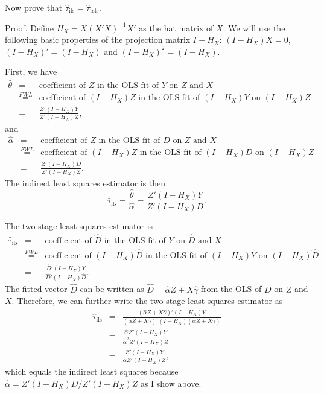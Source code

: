 \documentclass[11pt]{article}
\theoremstyle{definition}
\begin{document}
Now prove that $ \hat{\tau}_{\text{ils}}  = \hat{\tau}_{\text{tsls}}$. 



Proof. Define $H_X = X(X'X)^{-1}X'$ as the hat matrix of $X$. We will use the following basic properties of the projection matrix $I-H_X$: $(I-H_X)X=0$, $(I-H_X)' = (I-H_X)$ and $(I-H_X)^2= (I-H_X)$.

First, we have
\begin{eqnarray*}
\hat{\theta} &=&  \text{coefficient of } Z \text{ in the OLS fit of } Y \text{ on } Z \text{ and } X \\
&\stackrel{FWL}{=} & \text{coefficient of } (I-H_X)Z \text{ in the OLS fit of } (I-H_X)Y \text{ on } (I-H_X)Z \\
&=& \frac{  Z' (I-H_X) Y }{  Z' (I-H_X) Z },
\end{eqnarray*}
and
\begin{eqnarray*}
\hat{\alpha} &=&  \text{coefficient of } Z \text{ in the OLS fit of } D \text{ on } Z \text{ and } X \\
&\stackrel{FWL}{=} & \text{coefficient of } (I-H_X)Z \text{ in the OLS fit of } (I-H_X)D \text{ on } (I-H_X)Z \\
&=& \frac{  Z' (I-H_X) D }{  Z' (I-H_X) Z }.
\end{eqnarray*}
The indirect least squares estimator is then
$$
 \hat{\tau}_{\text{ils}}  =  \frac{  \hat{\theta} }{  \hat{\alpha}  } 
=  \frac{     Z' (I-H_X) Y      }{     Z' (I-H_X) D  } .
$$


The two-stage least squares estimator is 
\begin{eqnarray*}
\hat{\tau}_{\text{ils}}  &=&  \text{coefficient of } \hat{D} \text{ in the OLS fit of } Y \text{ on } \hat{D}  \text{ and } X \\
&\stackrel{FWL}{=} & \text{coefficient of }  (I-H_X)\hat{D} \text{ in the OLS fit of }  (I-H_X)Y \text{ on }  (I-H_X) \hat{D}   \\
&=& \frac{     \hat{D}' (I-H_X) Y      }{     \hat{D}' (I-H_X) \hat{D}  } .
\end{eqnarray*}
The fitted vector $\hat{D}$ can be written as $\hat{D} =  \hat{\alpha}  Z + X \hat{\gamma}$ from the OLS of $D$ on $Z$ and $X$. Therefore, we can further write the two-stage least squares estimator as
\begin{eqnarray*}
\hat{\tau}_{\text{ils}}  &=& \frac{    ( \hat{\alpha}  Z + X \hat{\gamma})' (I-H_X) Y      }{    ( \hat{\alpha}  Z + X \hat{\gamma})' (I-H_X) ( \hat{\alpha}  Z + X \hat{\gamma}) } \\
&=& \frac{    \hat{\alpha}  Z  ' (I-H_X) Y      }{     \hat{\alpha}^2  Z ' (I-H_X) Z } \\
&=& \frac{   Z  ' (I-H_X) Y      }{     \hat{\alpha} Z ' (I-H_X) Z } ,
\end{eqnarray*}
which equals the indirect least squares because $ \hat{\alpha}  = Z' (I-H_X) D /  Z' (I-H_X) Z $ as I show above. 
\end{document}
